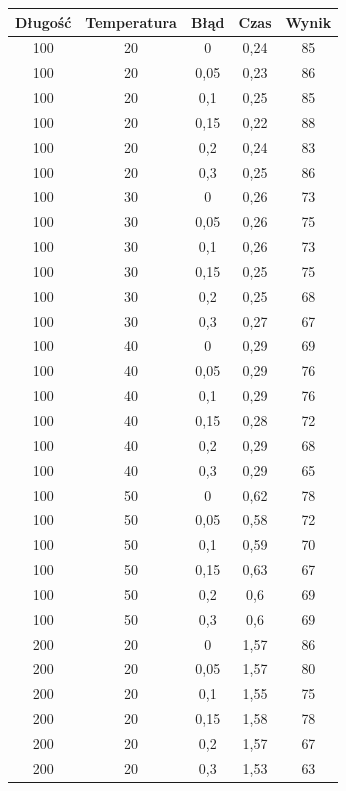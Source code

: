 \documentclass{article}
\begin{document}
\begin{longtable}{c|c|c|c|c}
Długość  & Temperatura  & Błąd & Czas    & Wynik  \\
\hline
100    & 20   & 0     & 0,24    & 85    \\
100    & 20   & 0,05  & 0,23    & 86    \\
100    & 20   & 0,1   & 0,25    & 85    \\
100    & 20   & 0,15  & 0,22    & 88    \\
100    & 20   & 0,2   & 0,24    & 83    \\
100    & 20   & 0,3   & 0,25    & 86    \\
100    & 30   & 0     & 0,26    & 73    \\
100    & 30   & 0,05  & 0,26    & 75    \\
100    & 30   & 0,1   & 0,26    & 73    \\
100    & 30   & 0,15  & 0,25    & 75    \\
100    & 30   & 0,2   & 0,25    & 68    \\
100    & 30   & 0,3   & 0,27    & 67    \\
100    & 40   & 0     & 0,29    & 69    \\
100    & 40   & 0,05  & 0,29    & 76    \\
100    & 40   & 0,1   & 0,29    & 76    \\
100    & 40   & 0,15  & 0,28    & 72    \\
100    & 40   & 0,2   & 0,29    & 68    \\
100    & 40   & 0,3   & 0,29    & 65    \\
100    & 50   & 0     & 0,62    & 78    \\
100    & 50   & 0,05  & 0,58    & 72    \\
100    & 50   & 0,1   & 0,59    & 70    \\
100    & 50   & 0,15  & 0,63    & 67    \\
100    & 50   & 0,2   & 0,6     & 69    \\
100    & 50   & 0,3   & 0,6     & 69    \\
200    & 20   & 0     & 1,57    & 86    \\
200    & 20   & 0,05  & 1,57    & 80    \\
200    & 20   & 0,1   & 1,55    & 75    \\
200    & 20   & 0,15  & 1,58    & 78    \\
200    & 20   & 0,2   & 1,57    & 67    \\
200    & 20   & 0,3   & 1,53    & 63    \\

\end{longtable}
\end{document}
